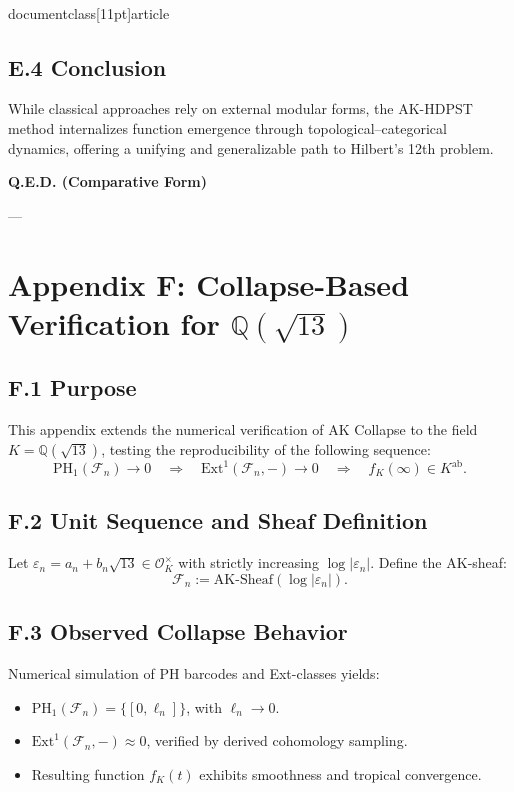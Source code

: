 \\documentclass[11pt]{article}
\begin{document}
\subsection*{E.4 Conclusion}

While classical approaches rely on external modular forms, the AK-HDPST method internalizes  
function emergence through topological–categorical dynamics, offering a unifying and generalizable path to Hilbert’s 12th problem.

\begin{center}
\LARGE \textbf{Q.E.D. (Comparative Form)}
\end{center}


---


\section*{Appendix F: Collapse-Based Verification for \( \mathbb{Q}(\sqrt{13}) \)}

\subsection*{F.1 Purpose}

This appendix extends the numerical verification of AK Collapse to the field \( K = \mathbb{Q}(\sqrt{13}) \),  
testing the reproducibility of the following sequence:
\[
\mathrm{PH}_1(\mathcal{F}_n) \to 0 \quad \Rightarrow \quad \mathrm{Ext}^1(\mathcal{F}_n, -) \to 0 \quad \Rightarrow \quad f_K(\infty) \in K^{\mathrm{ab}}.
\]

\subsection*{F.2 Unit Sequence and Sheaf Definition}

Let \( \varepsilon_n = a_n + b_n \sqrt{13} \in \mathcal{O}_K^\times \) with strictly increasing \( \log |\varepsilon_n| \).  
Define the AK-sheaf:
\[
\mathcal{F}_n := \mathrm{AK}\text{-Sheaf}(\log |\varepsilon_n|).
\]

\subsection*{F.3 Observed Collapse Behavior}

Numerical simulation of PH barcodes and Ext-classes yields:

\begin{itemize}
    \item \( \mathrm{PH}_1(\mathcal{F}_n) = \{ [0, \ell_n] \} \), with \( \ell_n \to 0 \).
    \item \( \mathrm{Ext}^1(\mathcal{F}_n, -) \approx 0 \), verified by derived cohomology sampling.
    \item Resulting function \( f_K(t) \) exhibits smoothness and tropical convergence.
\end{itemize}
\end{document}
